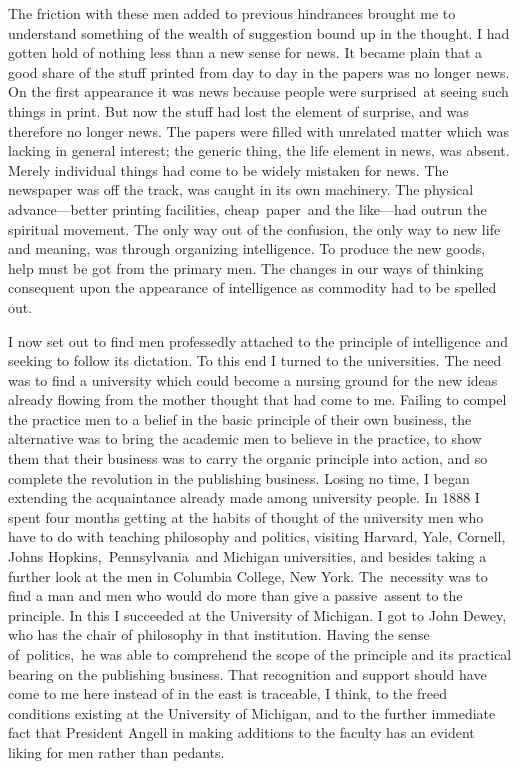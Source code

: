 \documentclass[twoside,symmetric,nobib,justified]{tufte-book}
\begin{document}
The friction with these men added to previous hindrances brought me to
understand something of the wealth of suggestion bound up in the
thought. I had gotten hold of nothing less than a new sense for news. It
became plain that a good share of the stuff printed from day to day in
the papers was no longer news. On the first appearance it was news
because people were surprised~at seeing such things in print. But now
the stuff had lost the element of surprise, and was therefore no longer
news. The papers were filled with unrelated matter which was lacking in
general interest; the generic thing, the life element in news, was
absent. Merely individual things had come to be widely mistaken for
news. The newspaper was off the track, was caught in its own machinery.
The physical advance---better printing facilities, cheap~paper~and the
like---had outrun the spiritual movement. The only way out of the
confusion, the only way to new life and meaning, was through organizing
intelligence. To produce the new goods, help must be got from the
primary men. The changes in our ways of thinking consequent upon the
appearance of intelligence as commodity had to be spelled out.~

\enlargethispage{\baselineskip}

I now set out to find men professedly attached to the principle of
intelligence and seeking to follow its dictation. To this end I turned
to the universities. The need was to find a university which could
become a nursing ground for the new ideas already flowing from the
mother thought that had come to me. Failing to compel the practice men
to a belief in the basic principle of their own business, the
alternative was to bring the academic men to believe in the practice, to
show them that their business was to carry the organic principle into
action, and so complete the revolution in the publishing business.
Losing no time, I began extending the acquaintance already made among
university people. In 1888 I spent four months getting at the habits of
thought of the university men who have to do with teaching philosophy
and politics, visiting Harvard, Yale, Cornell, Johns
Hopkins,~Pennsylvania~and Michigan universities, and besides taking a
further look at the men in Columbia College, New York. The~necessity was
to find a man and men who would do more than give a passive~assent to
the principle. In this I succeeded at the University of Michigan. I got
to John Dewey, who has the chair of philosophy in that institution.
Having the sense of~politics,~he was able to comprehend the scope of the
principle and its practical bearing on the publishing business. That
recognition and support should have come to me here instead of in the
east is traceable, I think, to the freed conditions existing at the
University of Michigan, and to the further immediate fact that President
Angell in making additions to the faculty has an evident liking for men
rather than pedants.~
\end{document}

